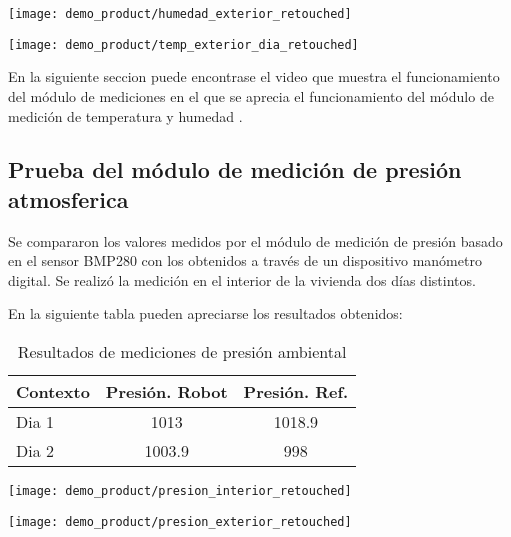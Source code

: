 \begin{center}
 \texttt{[image: demo\_product/humedad\_exterior\_retouched]}
   \label{fig:humedad_interior}
\end{center}

\begin{center}
 \texttt{[image: demo\_product/temp\_exterior\_dia\_retouched]}
   \label{fig:humedad_interior}
\end{center}

En la siguiente seccion puede encontrase el video que muestra el funcionamiento del módulo de mediciones en el que se aprecia el funcionamiento del módulo de medición de temperatura y humedad \cite{DemoMediciones}.

\subsection{Prueba del módulo de medición de presión atmosferica}

Se compararon los valores medidos por el módulo de medición de presión basado en el sensor BMP280 con los obtenidos a través de un dispositivo manómetro digital. Se realizó la medición en el interior de la vivienda dos días distintos.

En la siguiente tabla pueden apreciarse los resultados obtenidos:

\begin{table}[h]
\centering
\caption[Resultados de mediciones de presión ambiental]{Resultados de mediciones de presión ambiental}
\begin{tabular}{l c c}
\toprule
\textbf{Contexto} & \textbf{Presión. Robot} & \textbf{Presión. Ref.} \\
\midrule
Dia 1 & 1013 & 1018.9 \\
Dia 2 & 1003.9 & 998 \\
\bottomrule
\hline
\end{tabular}
\end{table}

\begin{center}
 \texttt{[image: demo\_product/presion\_interior\_retouched]}
   \label{fig:humedad_interior}
\end{center}

\begin{center}
 \texttt{[image: demo\_product/presion\_exterior\_retouched]}
   \label{fig:humedad_interior}
\end{center}

